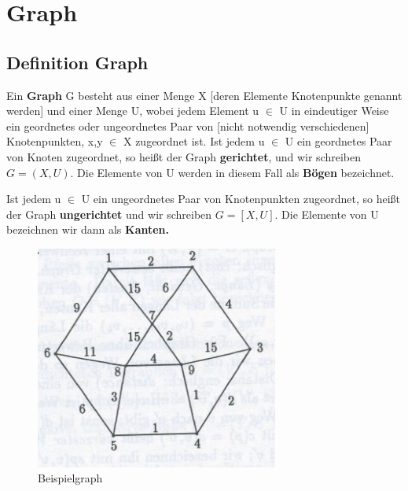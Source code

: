 
\chapter{Graph}

\section{Definition Graph}


\begin{theorem}
Ein \textbf{Graph} G besteht aus einer Menge X [deren Elemente Knotenpunkte genannt werden] und einer Menge U, wobei jedem Element u $\in$ U in eindeutiger Weise ein geordnetes oder ungeordnetes Paar von [nicht notwendig verschiedenen] Knotenpunkten, x,y $\in$ X zugeordnet ist.
Ist jedem u $\in$ U ein geordnetes Paar von Knoten zugeordnet, so heißt der Graph \textbf{gerichtet}, und wir schreiben 
	$G= (X, U)$.
Die Elemente von U werden in diesem Fall als \textbf{Bögen} bezeichnet.

Ist jedem u $\in$ U ein ungeordnetes Paar von Knotenpunkten zugeordnet, so heißt der Graph \textbf{ungerichtet} und wir schreiben 
	$G=[X,U]$. 
Die Elemente von U bezeichnen wir dann als \textbf{Kanten.} \\
\cite[S. 9]{Biess09} 	%
\end{theorem} 

\begin{figure}[h]
\centering
\includegraphics[width = 8cm]{./chapters/Graph.jpg}
\caption{Beispielgraph \cite[S.572 Abb. 8.18]{OttWid90}
}
\label{a1}
\end{figure}


